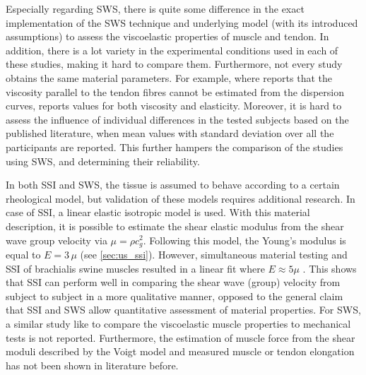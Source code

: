 Especially regarding SWS, there is quite some difference in the exact implementation of the SWS technique and underlying model (with its introduced assumptions) to assess the viscoelastic properties of muscle and tendon. In addition, there is a lot variety in the experimental conditions used in each of these studies, making it hard to compare them. Furthermore, not every study obtains the same material parameters. For example, where \cite{brum_vivo_2014, helfenstein-didier_vivo_2016} reports that the viscosity parallel to the tendon fibres cannot be estimated from the dispersion curves, \cite{cortes_continuous_2015} reports values for both viscosity and elasticity. Moreover, it is hard to assess the influence of individual differences in the tested subjects based on the published literature, when mean values with standard deviation over all the participants are reported. This further hampers the comparison of the studies using SWS, and determining their reliability.

In both SSI and SWS, the tissue is assumed to behave according to a certain rheological model, but validation of these models requires additional research. In case of SSI, a linear elastic isotropic model is used. With this material description, it is possible to estimate the shear elastic modulus from the shear wave group velocity via $\mu=\rho c_g^2$. Following this model, the Young's modulus is equal to $E = 3\, \mu$ (see \autoref{sec:us_ssi}). However, simultaneous material testing and SSI of brachialis swine muscles resulted in a linear fit where $E \approx 5\mu$ \cite{eby_validation_2013}. This shows that SSI can perform well in comparing the shear wave (group) velocity from subject to subject in a more qualitative manner, opposed to the general claim that SSI and SWS allow quantitative assessment of material properties. For SWS, a similar study like \cite{eby_validation_2013} to compare the viscoelastic muscle properties to mechanical tests is not reported. Furthermore, the estimation of muscle force from the shear moduli described by the Voigt model and measured muscle or tendon elongation has not been shown in literature before.


